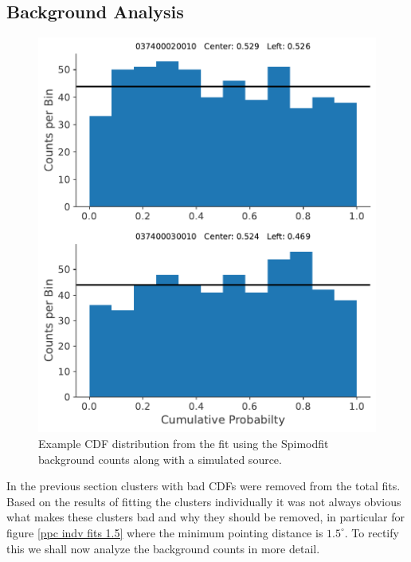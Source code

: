 \documentclass{report}
\begin{document}
\FloatBarrier

\pagebreak

\subsection{Background Analysis} \label{sec back anal}


\begin{figure}
  \vspace{-30pt}
  \includegraphics[width=\linewidth]{Images/PPC_and_Background_Analysis/037400020010_037400030010_cdf_smf_bkg.pdf}
  \vspace{-20pt}
  \caption{Example CDF distribution from the fit using the Spimodfit background counts along with a simulated source.}
  \vspace{+10pt}
  \label{fig smf cdf}
\end{figure}

In the previous section clusters with bad CDFs were removed from the total fits. Based on the results of fitting the clusters individually it was not always obvious what makes these clusters bad and why they should be removed, in particular for figure \ref{ppc indv fits 1.5} where the minimum pointing distance is $1.5^\circ$. To rectify this we shall now analyze the background counts in more detail.
\end{document}
